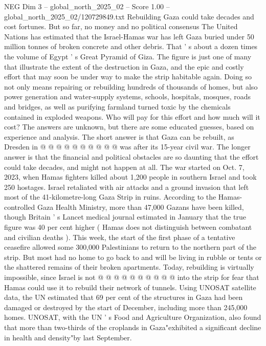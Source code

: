 \begin{textsample}{NEG Dim 3 – global\_north\_2025\_02 – Score 1.00 – global\_north\_2025\_02/120729849.txt}  \label{ex:f3_neg_175}
Rebuilding Gaza could take decades and cost fortunes.
But so far, no money and no political consensus The United Nations has estimated that the Israel-Hamas war has left Gaza buried under 50 million tonnes of broken concrete and other debris.
That ' s about a dozen times the volume of Egypt ' s Great Pyramid of Giza.
The figure is just one of many that illustrate the extent of the destruction in Gaza, and the epic and costly effort that may soon be under way to make the strip habitable again.
Doing so not only means repairing or rebuilding hundreds of thousands of homes, but also power generation and water-supply systems, schools, hospitals, mosques, roads and bridges, as well as purifying farmland turned toxic by the chemicals contained in exploded weapons.
Who will pay for this effort and how much will it cost?
The answers are unknown, but there are some educated guesses, based on experience and analysis.
The short answer is that Gaza can be rebuilt, as Dresden in @ @ @ @ @ @ @ @ @ @ was after its 15-year civil war.
The longer answer is that the financial and political obstacles are so daunting that the effort could take decades, and might not happen at all.
The war started on Oct. 7, 2023, when Hamas fighters killed about 1,200 people in southern Israel and took 250 hostages.
Israel retaliated with air attacks and a ground invasion that left most of the 41-kilometre-long Gaza Strip in ruins.
According to the Hamas-controlled Gaza Health Ministry, more than 47,000 Gazans have been killed, though Britain ' s Lancet medical journal estimated in January that the true figure was 40 per cent higher ( Hamas does not distinguish between combatant and civilian deaths ).
This week, the start of the first phase of a tentative ceasefire allowed some 300,000 Palestinians to return to the northern part of the strip.
But most had no home to go back to and will be living in rubble or tents or the shattered remains of their broken apartments.
Today, rebuilding is virtually impossible, since Israel is not @ @ @ @ @ @ @ @ @ @ into the strip for fear that Hamas could use it to rebuild their network of tunnels.
Using UNOSAT satellite data, the UN estimated that 69 per cent of the structures in Gaza had been damaged or destroyed by the start of December, including more than 245,000 homes.
UNOSAT, with the UN ' s Food and Agriculture Organization, also found that more than two-thirds of the croplands in Gaza"exhibited a significant decline in health and density"by last September.

\end{textsample}
